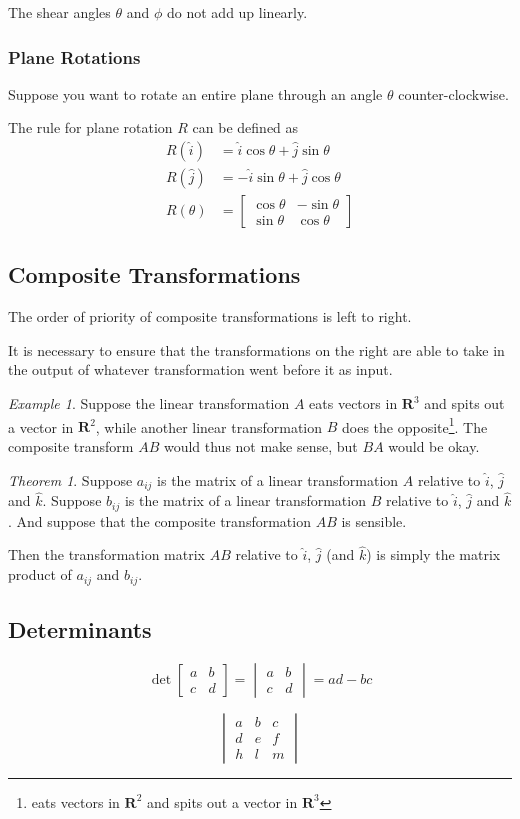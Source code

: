 \documentclass[a4paper]{article}
\theoremstyle{remark}
\newtheorem{example}{Example}
\theoremstyle{theorem}
\newtheorem{theorem}{Theorem}
\begin{document}
The shear angles $\theta$ and $\phi$ do not add up linearly.

\subsubsection{Plane Rotations}
Suppose you want to rotate an entire plane through an angle $\theta$ counter-clockwise.

The rule for plane rotation $R$ can be defined as
\begin{align}
	R(\hat{i})	& = \hat{i}\cos{\theta} + \hat{j}\sin{\theta}\\
	R(\hat{j}) 	& = -\hat{i}\sin{\theta} + \hat{j}\cos{\theta} \\
	R(\theta) 	& = \begin{bmatrix} \cos{\theta} & -\sin{\theta} \\ \sin{\theta} & \cos{\theta} \end{bmatrix}
\end{align}

\subsection{Composite Transformations}
The order of priority of composite transformations is left to right.

It is necessary to ensure that the transformations on the right are able to take in the output of whatever transformation went before it as input.

\begin{example}
	Suppose the linear transformation $A$ eats vectors in $\mathbf{R}^3$ and spits out a vector in $\mathbf{R}^2$, while another linear transformation $B$ does the opposite\footnote{eats vectors in $\mathbf{R}^2$ and spits out a vector in $\mathbf{R}^3$}.
	The composite transform $AB$ would thus not make sense, but $BA$ would be okay.
\end{example}

\begin{theorem}
	Suppose $a_{ij}$ is the matrix of a linear transformation $A$ relative to $\hat{i}$, $\hat{j}$ and $\hat{k}$.
	Suppose $b_{ij}$ is the matrix of a linear transformation $B$ relative to $\hat{i}$, $\hat{j}$ and $\hat{k}$.
	And suppose that the composite transformation $AB$ is sensible.

	Then the transformation matrix $AB$ relative to $\hat{i}$, $\hat{j}$ (and $\hat{k}$) is simply the matrix product of $a_{ij}$ and $b_{ij}$.
\end{theorem}

\subsection{Determinants}
\begin{equation}
	\det 
	\begin{bmatrix}
		a	& b \\
		c	& d
	\end{bmatrix}
	=
	\begin{vmatrix}
		a & b \\
		c & d
	\end{vmatrix}
	= ad - bc
\end{equation}

\begin{equation}
	\begin{vmatrix}
	a & b & c \\
	d & e & f \\
	h & l & m 
	\end{vmatrix}
\end{equation}
\end{document}
